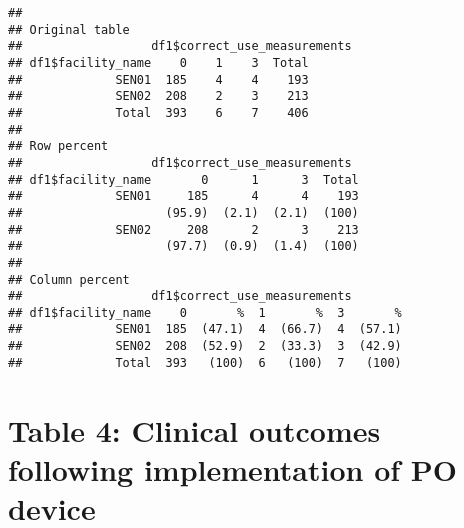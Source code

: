 \documentclass[
]{article}
\begin{document}
\begin{verbatim}
## 
## Original table 
##                  df1$correct_use_measurements
## df1$facility_name    0    1    3  Total
##             SEN01  185    4    4    193
##             SEN02  208    2    3    213
##             Total  393    6    7    406
## 
## Row percent 
##                  df1$correct_use_measurements
## df1$facility_name       0      1      3  Total
##             SEN01     185      4      4    193
##                    (95.9)  (2.1)  (2.1)  (100)
##             SEN02     208      2      3    213
##                    (97.7)  (0.9)  (1.4)  (100)
## 
## Column percent 
##                  df1$correct_use_measurements
## df1$facility_name    0       %  1       %  3       %
##             SEN01  185  (47.1)  4  (66.7)  4  (57.1)
##             SEN02  208  (52.9)  2  (33.3)  3  (42.9)
##             Total  393   (100)  6   (100)  7   (100)
\end{verbatim}

\hypertarget{table-4-clinical-outcomes-following-implementation-of-po-device}{%
\section{Table 4: Clinical outcomes following implementation of PO
device}\label{table-4-clinical-outcomes-following-implementation-of-po-device}}
\end{document}
